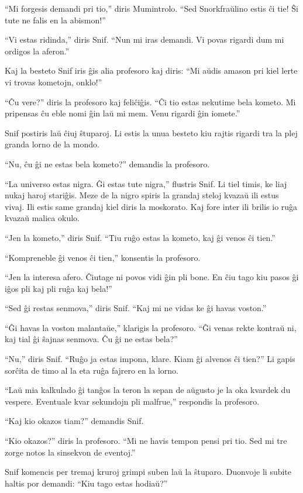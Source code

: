 ``Mi forgesis demandi pri tio,'' diris Mumintrolo. ``Sed Snorkfraŭlino estis ĉi tie! Ŝi tute ne falis en la abismon!''

``Vi estas ridinda,'' diris Snif. ``Nun mi iras demandi. Vi povas rigardi dum mi ordigos la aferon.''

Kaj la besteto Snif iris ĝis alia profesoro kaj diris: ``Mi aŭdis amason pri kiel lerte vi trovas kometojn, onklo!''

``Ĉu vere?'' diris la profesoro kaj feliĉiĝis. ``Ĉi tio estas nekutime bela kometo. Mi pripensas ĉu eble nomi ĝin laŭ mi mem. Venu rigardi ĝin iomete.''

Snif postiris laŭ ĉiuj ŝtuparoj. Li estis la unua besteto kiu rajtis rigardi tra la plej granda lorno de la mondo.

``Nu, ĉu ĝi ne estas bela kometo?'' demandis la profesoro.

``La universo estas nigra. Ĝi estas tute nigra,'' flustris Snif. Li tiel timis, ke liaj nukaj haroj stariĝis. Meze de la nigro spiris la grandaj steloj kvazaŭ ili estus vivaj. Ili estis same grandaj kiel diris la moskorato. Kaj fore inter ili brilis io ruĝa kvazaŭ malica okulo.

``Jen la kometo,'' diris Snif. ``Tiu ruĝo estas la kometo, kaj ĝi venos ĉi tien.''

``Kompreneble ĝi venos ĉi tien,'' konsentis la profesoro.

``Jen la interesa afero. Ĉiutage ni povos vidi ĝin pli bone. En ĉiu tago kiu pasos ĝi iĝos pli kaj pli ruĝa kaj bela!''

``Sed ĝi restas senmova,'' diris Snif. ``Kaj mi ne vidas ke ĝi havas voston.''

``Ĝi havas la voston malantaŭe,'' klarigis la profesoro. ``Ĝi venas rekte kontraŭ ni, kaj tial ĝi ŝajnas senmova. Ĉu ĝi ne estas bela?''

``Nu,'' diris Snif. ``Ruĝo ja estas impona, klare. Kiam ĝi alvenos ĉi tien?'' Li gapis sorĉita de timo al la eta ruĝa fajrero en la lorno.

``Laŭ mia kalkulado ĝi tanĝos la teron la sepan de aŭgusto je la oka kvardek du vespere. Eventuale kvar sekundojn pli malfrue,'' respondis la profesoro.

``Kaj kio okazos tiam?'' demandis Snif.

``Kio okazos?'' diris la profesoro. ``Mi ne havis tempon pensi pri tio. Sed mi tre zorge notos la sinsekvon de eventoj.''

Snif komencis per tremaj kruroj grimpi suben laŭ la ŝtuparo. Duonvoje li subite haltis por demandi: ``Kiu tago estas hodiaŭ?''

